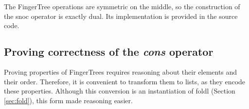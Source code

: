 \documentclass[12pt,twoside,notitlepage]{report}
\begin{document}
The FingerTree operations are symmetric on the middle, so the construction of the snoc operator is exactly dual. Its implementation is provided in the source code.

\subsection{Proving correctness of the \textit{cons} operator}

Proving properties of FingerTrees requires reasoning about their elements and their order. Therefore, it is convenient to transform them to lists, as they encode these properties.
Although this conversion is an instantiation of foldl (Section \ref{sec:fold}), this form made reasoning easier.

\begin{code}
\\
\> \AgdaSymbol{:}  \AgdaSymbol{\{}\AgdaSymbol{\}\{} \AgdaSymbol{:}  \AgdaSymbol{\}\{} \AgdaSymbol{:}   \AgdaSymbol{\}}\<%
\\
\>[0]\<[10]%
\>[10]  \AgdaSymbol{:}   \<%
\\
\>[0]\<[10]%
\>[10]  \AgdaSymbol{:}     \AgdaSymbol{\{} \AgdaSymbol{:} \AgdaSymbol{\}}\<%
\\
\>[0]\<[10]%
\>[10]    \AgdaSymbol{\{}\AgdaSymbol{\}}\<%
\\
\>[0]\<[10]%
\>[10]  \<%
\\
\>  \AgdaSymbol{=} \AgdaInductiveConstructor{[]}\<%
\\
\> \AgdaSymbol{(} \AgdaSymbol{)} \AgdaSymbol{=}   \AgdaInductiveConstructor{[]}\<%
\\
\> \AgdaSymbol{(}   \AgdaSymbol{)} \AgdaSymbol{=} \AgdaSymbol{(} \AgdaSymbol{)} \AgdaFunction{++}\<%
\\
\>[10]\<[28]%
\>[28]\AgdaSymbol{(} \AgdaSymbol{(} \AgdaSymbol{))} \AgdaFunction{++}\<%
\\
\>[10]\<[28]%
\>[28]\AgdaSymbol{(} \AgdaSymbol{)}\<%
\\
\end{code}
\end{document}
